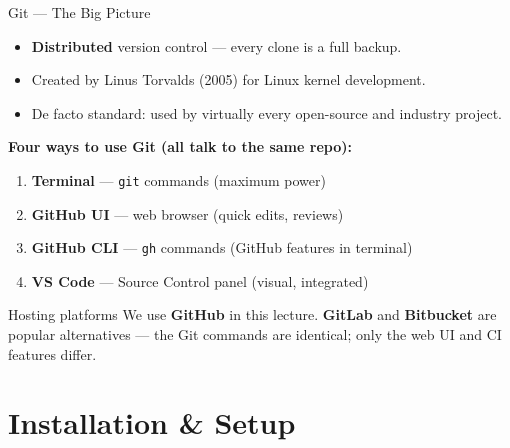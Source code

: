 \documentclass[aspectratio=169, 11pt]{beamer}
\begin{document}
\begin{frame}{Git --- The Big Picture}
  \begin{itemize}
    \item \textbf{Distributed} version control --- every clone is a full backup.
    \item Created by Linus Torvalds (2005) for Linux kernel development.
    \item De facto standard: used by virtually every open-source and industry project.
  \end{itemize}

  \vspace{0.5em}
  \textbf{Four ways to use Git (all talk to the same repo):}
  \begin{enumerate}
    \item \textbf{Terminal} --- \texttt{git} commands (maximum power)
    \item \textbf{GitHub UI} --- web browser (quick edits, reviews)
    \item \textbf{GitHub CLI} --- \texttt{gh} commands (GitHub features in terminal)
    \item \textbf{VS Code} --- Source Control panel (visual, integrated)
  \end{enumerate}

  \vspace{0.5em}
  \begin{alertblock}{Hosting platforms}
    We use \textbf{GitHub} in this lecture. \textbf{GitLab} and \textbf{Bitbucket} are popular alternatives --- the Git commands are identical; only the web UI and CI features differ.
  \end{alertblock}
\end{frame}

\section{Installation \& Setup}
\end{document}

